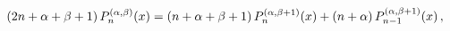 \[(2n+\alpha+\beta+1)\mathop{P^{(\alpha,\beta)}_{n}\/}\nolimits\!\left(x\right)=%
(n+\alpha+\beta+1)\mathop{P^{(\alpha,\beta+1)}_{n}\/}\nolimits\!\left(x\right)%
+(n+\alpha)\mathop{P^{(\alpha,\beta+1)}_{n-1}\/}\nolimits\!\left(x\right),\]